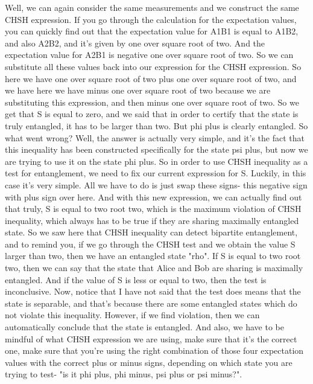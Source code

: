 Well, we can again consider the same measurements and we construct the same CHSH expression. If you go through the calculation for the expectation values, you can quickly find out that the expectation value for A1B1 is equal to A1B2, and also A2B2, and it's given by one over square root of two. And the expectation value for A2B1 is negative one over square root of two. So we can substitute all these values back into our expression for the CHSH expression. So here we have one over square root of two plus one over square root of two, and we have here we have minus one over square root of two because we are substituting this expression, and then minus one over square root of two. So we get that S is equal to zero, and we said that in order to certify that the state is truly entangled, it has to be larger than two. But phi plus is clearly entangled. So what went wrong? Well, the answer is actually very simple, and it's the fact that this inequality has been constructed specifically for the state psi plus, but now we are trying to use it on the state phi plus. So in order to use CHSH inequality as a test for entanglement, we need to fix our current expression for S. Luckily, in this case it's very simple. All we have to do is just swap these signs- this negative sign with plus sign over here. And with this new expression, we can actually find out that truly, S is equal to two root two, which is the maximum violation of CHSH inequality, which always has to be true if they are sharing maximally entangled state. So we saw here that CHSH inequality can detect bipartite entanglement, and to remind you, if we go through the CHSH test and we obtain the value S larger than two, then we have an entangled state "rho". If S is equal to two root two, then we can say that the state that Alice and Bob are sharing is maximally entangled. And if the value of S is less or equal to two, then the test is inconclusive. Now, notice that I have not said that the test does means that the state is separable, and that's because there are some entangled states which do not violate this inequality. However, if we find violation, then we can automatically conclude that the state is entangled. And also, we have to be mindful of what CHSH expression we are using, make sure that it's the correct one, make sure that you're using the right combination of those four expectation values with the correct plus or minus signs, depending on which state you are trying to test- "is it phi plus, phi minus, psi plus or psi minus?".



